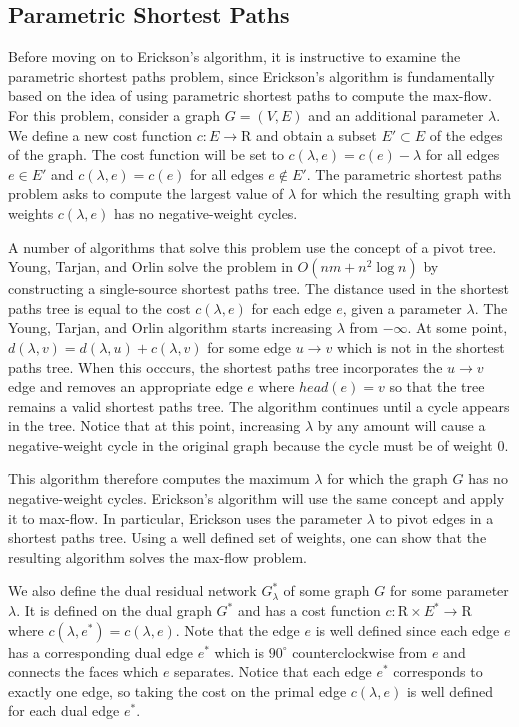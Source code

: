 \documentclass[12pt]{article}
\begin{document}
\subsection{Parametric Shortest Paths}

Before moving on to Erickson's algorithm, it is instructive to examine the parametric shortest paths problem, since Erickson's algorithm is fundamentally based on the idea of using parametric shortest paths to compute the max-flow. For this problem, consider a graph $G = (V,E)$ and an additional parameter $\lambda$. We define a new cost function $c : E \to \mathrm{R}$ and obtain a subset $E' \subset E$ of the edges of the graph. The cost function will be set to $c(\lambda, e) = c(e) - \lambda$ for all edges $e \in E'$ and $c(\lambda, e) = c(e)$ for all edges $e \notin E'$. The parametric shortest paths problem asks to compute the largest value of $\lambda$ for which the resulting graph with weights $c(\lambda, e)$ has no negative-weight cycles. 

A number of algorithms that solve this problem use the concept of a pivot tree. Young, Tarjan, and Orlin \cite{youngtarjanorlin1991} solve the problem in $O(nm + n^2 \log n)$ by constructing a single-source shortest paths tree. The distance used in the shortest paths tree is equal to the cost $c(\lambda, e)$ for each edge $e$, given a parameter $\lambda$. The Young, Tarjan, and Orlin algorithm starts increasing $\lambda$ from $-\infty$. At some point, $d(\lambda, v) = d(\lambda, u) + c(\lambda, v)$ for some edge $u \to v$ which is not in the shortest paths tree. When this occcurs, the shortest paths tree incorporates the $u \to v$ edge and removes an appropriate edge $e$ where $head(e) = v$ so that the tree remains a valid shortest paths tree. The algorithm continues until a cycle appears in the tree. Notice that at this point, increasing $\lambda$ by any amount will cause a negative-weight cycle in the original graph because the cycle must be of weight 0. 

This algorithm therefore computes the maximum $\lambda$ for which the graph $G$ has no negative-weight cycles. Erickson's algorithm will use the same concept and apply it to max-flow. In particular, Erickson uses the parameter $\lambda$ to pivot edges in a shortest paths tree. Using a well defined set of weights, one can show that the resulting algorithm solves the max-flow problem.

We also define the dual residual network $G^*_\lambda$ of some graph $G$ for some parameter $\lambda$. It is defined on the dual graph $G^*$ and has a cost function $c : \mathrm{R} \times E^* \to \mathrm{R}$ where $c(\lambda, e^*) = c(\lambda, e)$. Note that the edge $e$ is well defined since each edge $e$ has a corresponding dual edge $e^*$ which is $90^\circ$ counterclockwise from $e$ and connects the faces which $e$ separates. Notice that each edge $e^*$ corresponds to exactly one edge, so taking the cost on the primal edge $c(\lambda, e)$ is well defined for each dual edge $e^*$. 
\end{document}
